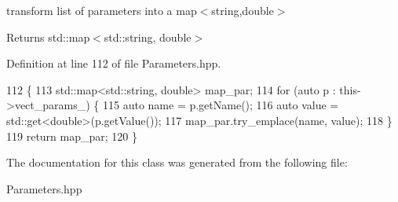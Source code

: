 transform list of parameters into a map$<$string,double$>$ 

\begin{DoxyReturn}{Returns}
std\+::map$<$std\+::string, double$>$ 
\end{DoxyReturn}


Definition at line 112 of file Parameters.\+hpp.


\begin{DoxyCode}
112                                                              \{
113   std::map<std::string, double> map\_par;
114   \textcolor{keywordflow}{for} (\textcolor{keyword}{auto} p : this->vect\_params\_) \{
115     \textcolor{keyword}{auto} name = p.getName();
116     \textcolor{keyword}{auto} value = std::get<double>(p.getValue());
117     map\_par.try\_emplace(name, value);
118   \}
119   \textcolor{keywordflow}{return} map\_par;
120 \}
\end{DoxyCode}


The documentation for this class was generated from the following file\+:\begin{DoxyCompactItemize}
\item 
Parameters.\+hpp\end{DoxyCompactItemize}
